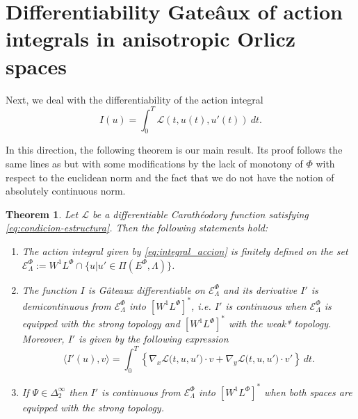 \documentclass[twoside]{article}
\newtheorem{thm}{Theorem}[section]
\theoremstyle{remark}
\newcommand{\lphi}{L^{\Phi}}
\newcommand{\ephi}{E^{\Phi}}
\newcommand{\wphi}{W^{1}\lphi}
\newcommand{\domi}{\mathcal{E}^{\Phi}}
\begin{document}
\section{Differentiability Gate\^aux of action integrals in anisotropic Orlicz spaces}

Next, we deal with the differentiability of the action integral 
\begin{equation}\label{eq:integral_accion}
I(u)=\int_{0}^T \mathcal{L}(t,u(t),u'(t))\ dt.
\end{equation}

In this direction, the following theorem is our main result. Its proof follows the same lines as \cite[Th. 3.2]{ABGMS2015} but with some modifications by the lack of monotony of $\Phi$ with  respect to the euclidean norm and the fact that we do not have the notion of absolutely continuous norm.


\begin{thm}\label{teo:diferenciabilidad}
Let $\mathcal{L}$ be a differentiable Carath\'eodory function satisfying \eqref{eq:condicion-estructura}.
Then the following statements hold:
\begin{enumerate}
\item \label{it:T1item1} \label{A1} The action integral given by \eqref{eq:integral_accion}
is finitely defined on the set $\domi_{\Lambda}:=W^{1}\lphi\cap\{u|u'\in\Pi(\ephi,\Lambda)\}$.

\item\label{it:T1item3} The function  $I$ is G\^ateaux differentiable on $\domi_{\Lambda}$ and  its derivative $I'$ is demicontinuous from 
$\domi_{\Lambda}$  into $\left[\wphi \right]^*$, i.e. $I'$ is continuous when $\domi_{\Lambda}$ is equipped with the strong topology and   $\left[\wphi \right]^*$ with the weak* topology. Moreover, $I'$ is given by the following expression
\begin{equation}\label{eq:DerAccion}
\langle  I'(u),v\rangle= \int_0^T \left\{\nabla_x\mathcal{L}\big(t,u,u'\big)\cdot v
+ \nabla_y\mathcal{L}\big(t,u,u'\big)\cdot v'\right\} \ dt.
\end{equation}

\item\label{it:T1item4}  If  $\Psi \in \Delta^{\infty}_2$ then 
  $I'$ is continuous from $\domi_{\Lambda}$ into $\left[\wphi\right]^*$ when both spaces are equipped with the strong topology.
\end{enumerate}
\end{thm}
\end{document}
